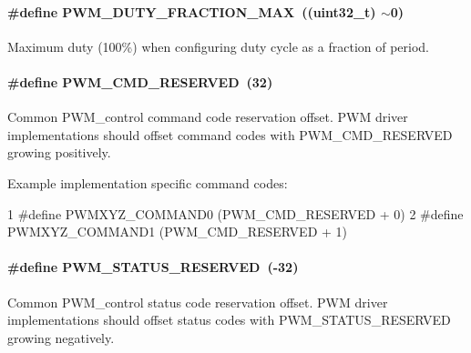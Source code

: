 \paragraph[{P\+W\+M\+\_\+\+D\+U\+T\+Y\+\_\+\+F\+R\+A\+C\+T\+I\+O\+N\+\_\+\+M\+A\+X}]{\setlength{\rightskip}{0pt plus 5cm}\#define P\+W\+M\+\_\+\+D\+U\+T\+Y\+\_\+\+F\+R\+A\+C\+T\+I\+O\+N\+\_\+\+M\+A\+X~((uint32\+\_\+t) $\sim$0)}\label{_p_w_m_8h_a8b2763bf16c6446a35d536ea532f6a6c}


Maximum duty (100\%) when configuring duty cycle as a fraction of period. 

\paragraph[{P\+W\+M\+\_\+\+C\+M\+D\+\_\+\+R\+E\+S\+E\+R\+V\+E\+D}]{\setlength{\rightskip}{0pt plus 5cm}\#define P\+W\+M\+\_\+\+C\+M\+D\+\_\+\+R\+E\+S\+E\+R\+V\+E\+D~(32)}\label{_p_w_m_8h_ad731f4db58c72d280900da4be6e3434c}
Common P\+W\+M\+\_\+control command code reservation offset. P\+W\+M driver implementations should offset command codes with P\+W\+M\+\_\+\+C\+M\+D\+\_\+\+R\+E\+S\+E\+R\+V\+E\+D growing positively.

Example implementation specific command codes\+: 
\begin{DoxyCode}
1 #define PWMXYZ\_COMMAND0         (PWM\_CMD\_RESERVED + 0)
2 #define PWMXYZ\_COMMAND1         (PWM\_CMD\_RESERVED + 1)
\end{DoxyCode}
\paragraph[{P\+W\+M\+\_\+\+S\+T\+A\+T\+U\+S\+\_\+\+R\+E\+S\+E\+R\+V\+E\+D}]{\setlength{\rightskip}{0pt plus 5cm}\#define P\+W\+M\+\_\+\+S\+T\+A\+T\+U\+S\+\_\+\+R\+E\+S\+E\+R\+V\+E\+D~(-\/32)}\label{_p_w_m_8h_a88616e9288d6e3a4dbab321af26cc04a}
Common P\+W\+M\+\_\+control status code reservation offset. P\+W\+M driver implementations should offset status codes with P\+W\+M\+\_\+\+S\+T\+A\+T\+U\+S\+\_\+\+R\+E\+S\+E\+R\+V\+E\+D growing negatively.

